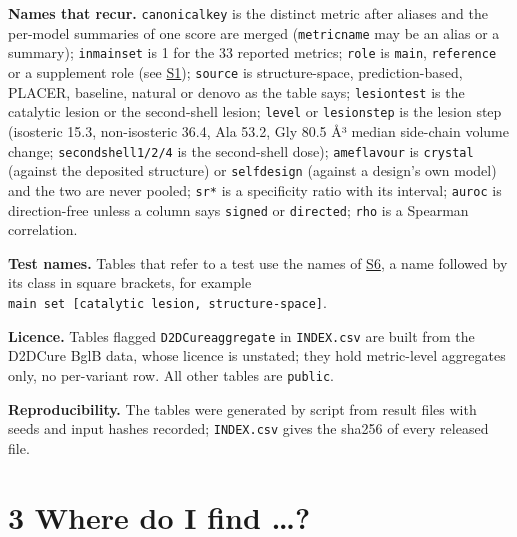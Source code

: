 \documentclass[
  10pt,
]{article}
\DeclareRobustCommand{\_}{\textunderscore\hspace{0pt}}
\begin{document}
\textbf{Names that
recur.}
\texttt{canonical\_key}
is the distinct
metric after aliases
and the per-model
summaries of one
score are merged
(\texttt{metric\_name}
may be an alias or a
summary);
\texttt{in\_main\_set}
is 1 for the 33
reported metrics;
\texttt{role} is
\texttt{main},
\texttt{reference}
or a supplement role
(see
\protect\hyperlink{S1}{S1});
\texttt{source} is
structure-space,
prediction-based,
PLACER, baseline,
natural or denovo as
the table says;
\texttt{lesion\_test}
is the catalytic
lesion or the
second-shell lesion;
\texttt{level} or
\texttt{lesion\_step}
is the lesion step
(isosteric 15.3,
non-isosteric 36.4,
Ala 53.2, Gly 80.5
Å³ median side-chain
volume change;
\texttt{second\_shell\_1/2/4}
is the second-shell
dose);
\texttt{ame\_flavour}
is \texttt{crystal}
(against the
deposited structure)
or
\texttt{self\_design}
(against a design's
own model) and the
two are never
pooled;
\texttt{sr\_*} is a
specificity ratio
with its interval;
\texttt{auroc} is
direction-free
unless a column says
\texttt{signed} or
\texttt{directed};
\texttt{rho} is a
Spearman
correlation.

\textbf{Test names.}
Tables that refer to
a test use the names
of
\protect\hyperlink{S6}{S6},
a name followed by
its class in square
brackets, for
example
\texttt{main\ set\ {[}catalytic\ lesion,\ structure-space{]}}.

\textbf{Licence.}
Tables flagged
\texttt{D2DCure\_aggregate}
in
\texttt{INDEX.csv}
are built from the
D2DCure BglB data,
whose licence is
unstated; they hold
metric-level
aggregates only, no
per-variant row. All
other tables are
\texttt{public}.

\textbf{Reproducibility.}
The tables were
generated by script
from result files
with seeds and input
hashes recorded;
\texttt{INDEX.csv}
gives the sha256 of
every released file.

\section{3 Where do
I find \ldots?}
\end{document}
